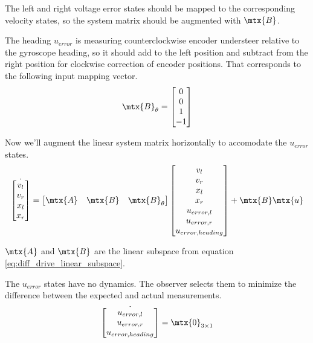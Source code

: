 The left and right voltage error states should be mapped to the corresponding
velocity states, so the system matrix should be augmented with $\mtx{B}$.

The heading $u_{error}$ is measuring counterclockwise encoder understeer
relative to the gyroscope heading, so it should add to the left position and
subtract from the right position for clockwise correction of encoder positions.
That corresponds to the following input mapping vector.
\begin{equation*}
  \mtx{B}_{\theta} = \begin{bmatrix}
    0 \\
    0 \\
    1 \\
    -1
  \end{bmatrix}
\end{equation*}

Now we'll augment the linear system matrix horizontally to accomodate the
$u_{error}$ states.
\begin{equation}
  \dot{\begin{bmatrix}
    v_l \\
    v_r \\
    x_l \\
    x_r
  \end{bmatrix}} =
    \begin{bmatrix}
      \mtx{A} & \mtx{B} & \mtx{B}_{\theta}
    \end{bmatrix}
    \begin{bmatrix}
      v_l \\
      v_r \\
      x_l \\
      x_r \\
      u_{error,l} \\
      u_{error,r} \\
      u_{error,heading}
    \end{bmatrix} + \mtx{B}\mtx{u}
\end{equation}

$\mtx{A}$ and $\mtx{B}$ are the linear subspace from equation
\eqref{eq:diff_drive_linear_subspace}.

The $u_{error}$ states have no dynamics. The observer selects them to minimize
the difference between the expected and actual measurements.
\begin{equation}
  \dot{\begin{bmatrix}
    u_{error,l} \\
    u_{error,r} \\
    u_{error,heading}
  \end{bmatrix}} = \mtx{0}_{3 \times 1}
\end{equation}


